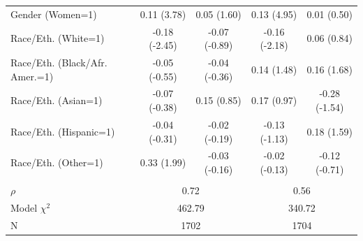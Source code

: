 \documentclass[11pt]{article}
\begin{document}
\begin{landscape}
\begin{table}[t]
\begin{tabular*}{\hsize}{@{\extracolsep{\fill}} l*{4}{c}}
Gender (Women=1)              &0.11 (3.78)&0.05 (1.60)&0.13 (4.95)&0.01 (0.50)\\
Race/Eth. (White=1)           &-0.18 (-2.45)&-0.07 (-0.89)&-0.16 (-2.18)&0.06 (0.84)\\
Race/Eth. (Black/Afr. Amer.=1)&-0.05 (-0.55)&-0.04 (-0.36)&0.14 (1.48)&0.16 (1.68)\\
Race/Eth. (Asian=1)           &-0.07 (-0.38)&0.15 (0.85)&0.17 (0.97)&-0.28 (-1.54)\\
Race/Eth. (Hispanic=1)        &-0.04 (-0.31)&-0.02 (-0.19)&-0.13 (-1.13)&0.18 (1.59)\\
Race/Eth. (Other=1)           &0.33 (1.99)&-0.03 (-0.16)&-0.02 (-0.13)&-0.12 (-0.71)\\ \\
$\rho$&\multicolumn{2}{c}{0.72}&\multicolumn{2}{c}{0.56}\\
Model $\chi^{2}$&\multicolumn{2}{c}{462.79}&\multicolumn{2}{c}{340.72}\\
N&\multicolumn{2}{c}{1702}&\multicolumn{2}{c}{1704}\\
\hline
\end{tabular*}
\label{tab2b}
\end{table}
\end{landscape}
\end{document}
